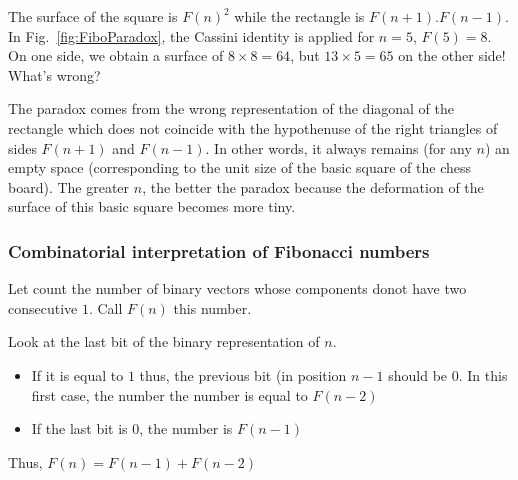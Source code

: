 The surface of the square is $F(n)^2$ while the rectangle is $F(n+1).F(n-1)$.
In Fig.~\ref{fig:FiboParadox}, the Cassini identity is applied for $n=5$, $F(5)=8$. 
On one side, we obtain a surface of $8 \times 8 = 64$, but $13 \times 5 = 65$ on the other side!
What's wrong?

The paradox comes from the wrong representation of the diagonal of the rectangle which does not coincide with the hypothenuse
of the right triangles of sides $F(n+1)$ and $F(n-1)$.
In other words, it always remains (for any $n$) an empty space (corresponding to the unit size of the basic square of the chess board).
The greater $n$, the better the paradox because the deformation of the surface of this basic square becomes more tiny. 


%
%

\subsubsection{Combinatorial interpretation of Fibonacci numbers}

Let count the number of binary vectors whose components donot have two consecutive $1$. Call $F(n)$ this number.

Look at the last bit of the binary representation of $n$.

\begin{itemize}
\item
If it is equal to $1$ thus, the previous bit (in position $n-1$ should be $0$.
In this first case, the number the number is equal to $F(n-2)$
\item
If the last bit is $0$, the number is $F(n-1)$
\end{itemize}
Thus, $F(n) = F(n-1) + F(n-2)$
\bigskip

